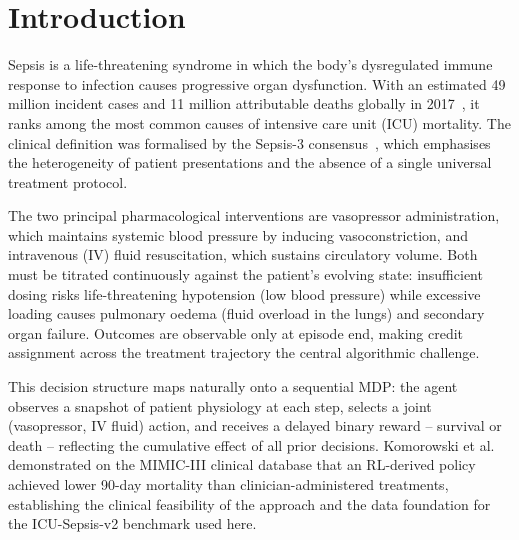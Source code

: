 \documentclass[11pt,a4paper]{article}
\begin{document}
\newpage

\pagestyle{fancy}
\fancyhf{}
\renewcommand{\headrulewidth}{1pt}
\renewcommand{\headrule}{%
  \begingroup\color{imsgreen}%
  \hrule height \headrulewidth width \headwidth%
  \endgroup}
\renewcommand{\footrulewidth}{0pt}
\fancyhead[R]{\sffamily\footnotesize\color{imsdarkgrey}\nouppercase{\leftmark}}
\fancyfoot[C]{\sffamily\small\color{imsdarkgrey}\thepage}
\renewcommand{\sectionmark}[1]{\markboth{#1}{}}

\tableofcontents
\newpage

\section{Introduction}
\label{sec:intro}

Sepsis is a life-threatening syndrome in which the body's dysregulated immune
response to infection causes progressive organ dysfunction. With an estimated
49 million incident cases and 11 million attributable deaths globally in
2017~\cite{rudd2020}, it ranks among the most common causes of intensive care
unit (ICU) mortality. The clinical definition was formalised by the Sepsis-3
consensus~\cite{singer2016}, which emphasises the heterogeneity of patient
presentations and the absence of a single universal treatment protocol.

The two principal pharmacological interventions are vasopressor administration,
which maintains systemic blood pressure by inducing vasoconstriction, and
intravenous (IV) fluid resuscitation, which sustains circulatory volume.
Both must be titrated continuously against the patient's evolving state:
insufficient dosing risks life-threatening hypotension (low blood pressure) while
excessive loading causes pulmonary oedema (fluid overload in the lungs) and
secondary organ failure. Outcomes are observable
only at episode end, making credit assignment across the treatment trajectory
the central algorithmic challenge.

This decision structure maps naturally onto a sequential MDP: the agent observes
a snapshot of patient physiology at each step, selects a joint (vasopressor,
IV fluid) action, and receives a delayed binary reward -- survival or death --
reflecting the cumulative effect of all prior decisions.
Komorowski et al.~\cite{komorowski2018} demonstrated on the MIMIC-III clinical
database that an RL-derived policy achieved lower 90-day mortality than
clinician-administered treatments, establishing the clinical feasibility of the
approach and the data foundation for the ICU-Sepsis-v2 benchmark used here.
\end{document}
